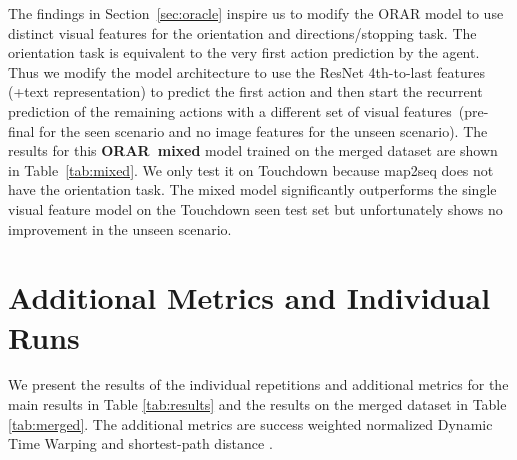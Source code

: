 \documentclass[11pt]{article}
\begin{document}
 The findings in Section~\ref{sec:oracle} inspire us to modify the ORAR model to use distinct visual features for the orientation and directions/stopping task. The orientation task is equivalent to the very first action prediction by the agent. Thus we modify the model architecture to use the ResNet 4th-to-last features (+text representation) to predict the first action and then start the recurrent prediction of the remaining actions with a different set of visual features~(pre-final for the seen scenario and no image features for the unseen scenario). The results for this \textbf{ORAR~mixed} model trained on the merged dataset are shown in Table~\ref{tab:mixed}. We only test it on Touchdown because map2seq does not have the orientation task. The mixed model significantly outperforms the single visual feature model on the Touchdown seen test set but unfortunately shows no improvement in the unseen scenario.

\section{Additional Metrics and Individual Runs}
We present the results of the individual repetitions and additional metrics for the main results in Table \ref{tab:results} and the results on the merged dataset in Table \ref{tab:merged}. The additional metrics are success weighted normalized Dynamic Time Warping \cite{ndtw} and shortest-path distance \cite{Chen2018Touchdown}.
\end{document}
